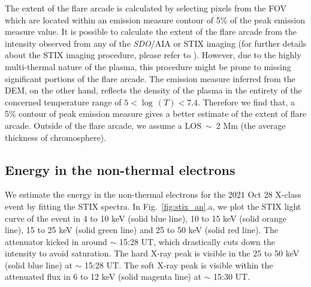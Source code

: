 The extent of the flare arcade is calculated by selecting pixels from the FOV which are located within an emission measure contour of 5\% of the peak emission measure value. It is possible to calculate the extent of the flare arcade from the intensity observed from any of the {\it SDO}/AIA or STIX imaging (for further details about the STIX imaging procedure, please refer to \cite{massa20}). However, due to the highly multi-thermal nature of the plasma, this procedure might be prone to missing significant portions of the flare arcade. The emission measure inferred from the DEM, on the other hand, reflects the density of the plasma in the entirety of the concerned temperature range of $5<\log\,(T)<7.4$. Therefore we find that, a 5\% contour of peak emission measure gives a better estimate of the extent of flare arcade. Outside of the flare arcade, we assume a LOS~$\sim$~2 Mm (the average thickness of chromosphere). 

\subsection{Energy in the non-thermal electrons}\label{sec:non-therm}

We estimate the energy in the non-thermal electrons for the 2021 Oct 28 X-class event by fitting the STIX spectra. In Fig.~\ref{fig:stix_an}.a, we plot the STIX light curve of the event in 4 to 10 keV (solid blue line), 10 to 15 keV (solid orange line), 15 to 25 keV (solid green line) and 25 to 50 keV (solid red line). The attenuator kicked in around $\sim$ 15:28 UT, which drastically cuts down the intensity to avoid saturation. The hard X-ray peak is visible in the 25 to 50 keV (solid blue line) at $\sim$ 15:28 UT. The soft X-ray peak is visible within the attenuated flux in 6 to 12 keV (solid magenta line) at $\sim$ 15:30 UT.

